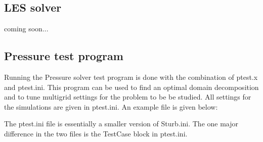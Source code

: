 \subsection{LES solver}
coming soon...

\subsection{Pressure test program}
Running the Pressure solver test program is done with the combination of
ptest.x and ptest.ini. This program can be used to find an optimal domain
decomposition and to tune multigrid settings for the problem to be be studied.
All settings for the simulations are given in ptest.ini. An example file is
given below:


The ptest.ini file is essentially a smaller version of Sturb.ini. The one major
difference in the two files is the TestCase block in ptest.ini. 
\vspace{12pt}

